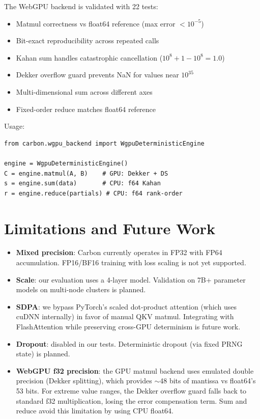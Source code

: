 \documentclass[11pt,a4paper]{article}
\begin{document}
The WebGPU backend is validated with 22 tests:
\begin{itemize}
  \item Matmul correctness vs float64 reference (max error $< 10^{-5}$)
  \item Bit-exact reproducibility across repeated calls
  \item Kahan sum handles catastrophic cancellation ($10^8 + 1 - 10^8 = 1.0$)
  \item Dekker overflow guard prevents NaN for values near $10^{35}$
  \item Multi-dimensional sum across different axes
  \item Fixed-order reduce matches float64 reference
\end{itemize}

Usage:
\begin{lstlisting}
from carbon.wgpu_backend import WgpuDeterministicEngine

engine = WgpuDeterministicEngine()
C = engine.matmul(A, B)    # GPU: Dekker + DS
s = engine.sum(data)       # CPU: f64 Kahan
r = engine.reduce(partials) # CPU: f64 rank-order
\end{lstlisting}

\section{Limitations and Future Work}

\begin{itemize}
  \item \textbf{Mixed precision}: Carbon currently operates in FP32 with
    FP64 accumulation. FP16/BF16 training with loss scaling is not yet supported.
  \item \textbf{Scale}: our evaluation uses a 4-layer model. Validation on
    7B+ parameter models on multi-node clusters is planned.
  \item \textbf{SDPA}: we bypass PyTorch's scaled dot-product attention
    (which uses cuDNN internally) in favor of manual QKV matmul. Integrating
    with FlashAttention while preserving cross-GPU determinism is future work.
  \item \textbf{Dropout}: disabled in our tests. Deterministic dropout
    (via fixed PRNG state) is planned.
  \item \textbf{WebGPU f32 precision}: the GPU matmul backend uses emulated
    double precision (Dekker splitting), which provides $\sim$48 bits of
    mantissa vs float64's 53 bits. For extreme value ranges, the Dekker
    overflow guard falls back to standard f32 multiplication, losing the
    error compensation term. Sum and reduce avoid this limitation by using
    CPU float64.
\end{itemize}
\end{document}
